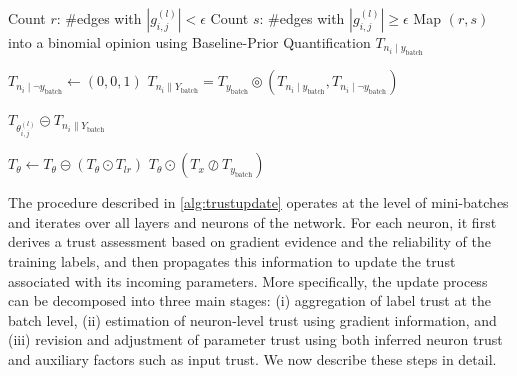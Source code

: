 \begin{algorithm}
\begin{algorithmic}[1]
        \State Count $r$: \#edges with $|g^{(l)}_{i,j}| < \epsilon$
        \State Count $s$: \#edges with $|g^{(l)}_{i,j}| \geq \epsilon$
        \State Map $(r,s)$ into a binomial opinion using Baseline-Prior Quantification
        \State \Return $T_{n_i \mid y_\text{batch}}$
    \EndFunction

        \State $T_{n_i \mid \lnot y_\text{batch}}  \longleftarrow  (0,0,1)$
        \State \Return $T_{n_i \parallel Y_\text{batch}} = T_{y_\text{batch}} \circledcirc (T_{n_i \mid y_\text{batch}}, T_{n_i \mid \lnot y_\text{batch}})$
    \EndFunction

        \State \Return $T_{\theta_{i,j}^{(l)}} \circleddash T_{n_i \parallel Y_\text{batch}}$ 
    \EndFunction

        \State $T_{\theta} \longleftarrow T_{\theta} \circleddash (T_{\theta} \odot T_{lr})$  \label{alg:l:lr}
        \State \Return $T_{\theta} \odot (T_{x} \oslash T_{y_\text{batch}})$ \label{alg:l:aux}
    \EndFunction

\end{algorithmic}
\label{alg:trustupdate}
\end{algorithm}
The procedure described in \cref{alg:trustupdate} operates at the level of mini-batches and iterates over all layers and neurons of the network. For each neuron, it first derives a trust assessment based on gradient evidence and the reliability of the training labels, and then propagates this information to update the trust associated with its incoming parameters. More specifically, the update process can be decomposed into three main stages: (i) aggregation of label trust at the batch level, (ii) estimation of neuron-level trust using gradient information, and (iii) revision and adjustment of parameter trust using both inferred neuron trust and auxiliary factors such as input trust. We now describe these steps in detail.

